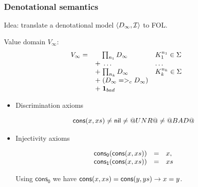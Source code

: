 \documentclass[serif,professionalfont]{beamer}
\begin{document}
\begin{frame}[fragile]
  \frametitle{Denotational semantics}

  Idea: translate a denotational model $\langle D_\infty,{\cal I}\rangle$ to FOL.

  Value domain $V_{\infty}$:
    \[V_{\infty} = \begin{array}[t]{ll}
             \quad\;{\prod_{n_1}{D_{\infty}}} & K_1^{n_1} \in \Sigma \\
             \; + \;\ldots                    & \ldots \\
             \; + \;{\prod_{n_k}{D_{\infty}}} & K_k^{n_k} \in \Sigma \\
             \; + \;(D_{\infty} =>_c D_{\infty}) \\
             \; + \;{\sf{\bf 1}}_{bad} \quad
    \end{array}\]

  \begin{itemize}
    \item Discrimination axioms

    $$
    \mathsf{cons}(x,xs) \neq \mathsf{nil} \neq @UNR@ \neq @BAD@
    $$

    \item Injectivity axioms

    \[\begin{array}{lcl}
      \mathsf{cons_0}(\mathsf{cons}(x,xs)) & = & x, \\
      \mathsf{cons_1}(\mathsf{cons}(x,xs)) & = & xs
    \end{array}\]

    Using $\mathsf{cons_0}$ we have $\mathsf{cons}(x,xs) = \mathsf{cons}(y,ys) \to x = y$.
  \end{itemize}

\end{frame}
\end{document}
